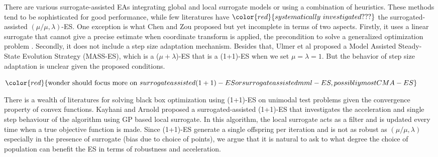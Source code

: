 There are various surrogate-assisted EAs integrating global and local surrogate models or using a combination of heuristics. These methods tend to be sophisticated for good performance, while few literatures have $\color{red}{systematically\ investigated ???}$ the surrogated-assisted $(\mu/\mu,\lambda)$-ES. One exception is what Chen and Zou \cite{10.1007/978-3-319-09333-8_4} proposed but yet incomplete in terms of two aspects. Firstly, it uses a linear surrogate that cannot give a precise estimate when coordinate transform is applied, the precondition to solve a generalized optimization problem \cite{DBLP:conf/ppsn/KayhaniA18}. Secondly, it does not include a step size adaptation mechanism. Besides that, Ulmer et al \cite{Ulmer2005} proposed a Model Assisted Steady-State Evolution Strategy (MASS-ES), which is a ($\mu+\lambda$)-ES that is a (1+1)-ES when we set $\mu=\lambda=1$. But the behavior of step size adaptation is unclear given the proposed conditions.




$\color{red}{\text{wonder should focus more on } surrogate assisted (1+1)-ES or surrogate assisted mml-ES, possibliy most CMA-ES}$

There is a wealth of literatures for solving black box optimization using (1+1)-ES on unimodal test problems given the convergence property of convex functions. Kayhani and Arnold \cite{DBLP:conf/ppsn/KayhaniA18} proposed a surrogated-assisted (1+1)-ES that investigates the acceleration and single step behaviour of the algorithm using GP based local surrogate. In this algorithm, the local surrogate acts as a filter and is updated every time when a true objective function is made. Since (1+1)-ES generate a single offspring per iteration and is not as robust as $(\mu/\mu,\lambda)$ especially in the presence of surrogate (bias due to choice of points), we argue that it is natural to ask to what degree the choice of population can benefit the ES in terms of robustness and acceleration.

 

